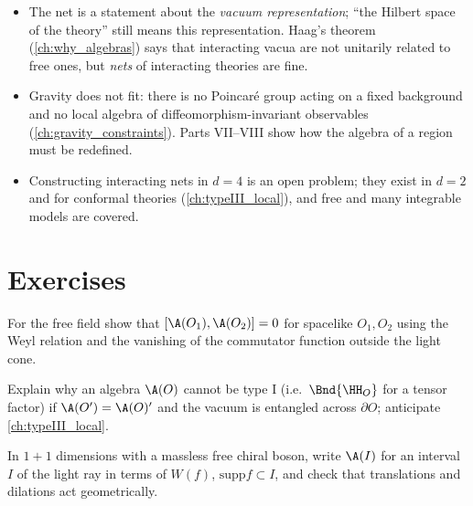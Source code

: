 \begin{whatwrong}
\begin{itemize}
\item The net is a statement about the \emph{vacuum representation}; ``the Hilbert space of the theory'' still means this representation. Haag's theorem (\cref{ch:why_algebras}) says that interacting vacua are not unitarily related to free ones, but \emph{nets} of interacting theories are fine.
\item Gravity does not fit: there is no Poincar\'e group acting on a fixed background and no local algebra of diffeomorphism-invariant observables (\cref{ch:gravity_constraints}). Parts VII--VIII show how the algebra of a region must be redefined.
\item Constructing interacting nets in $d=4$ is an open problem; they exist in $d=2$ and for conformal theories (\cref{ch:typeIII_local}), and free and many integrable models are covered.
\end{itemize}
\end{whatwrong}

\section*{Exercises}
\begin{exercise}
For the free field show that $[\A(O_1),\A(O_2)]=0$ for spacelike $O_1,O_2$ using the Weyl relation and the vanishing of the commutator function outside the light cone.
\end{exercise}
\begin{exercise}
Explain why an algebra $\A(O)$ cannot be type I (i.e.\ $\Bnd{\HH_O}$ for a tensor factor) if $\A(O')=\A(O)'$ and the vacuum is entangled across $\partial O$; anticipate \cref{ch:typeIII_local}.
\end{exercise}
\begin{exercise}
In $1+1$ dimensions with a massless free chiral boson, write $\A(I)$ for an interval $I$ of the light ray in terms of $W(f)$, $\mathrm{supp}f\subset I$, and check that translations and dilations act geometrically.
\end{exercise}
